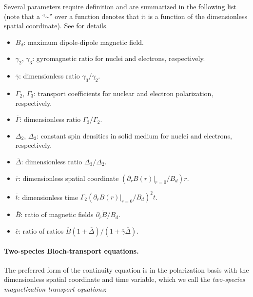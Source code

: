 \documentclass[%
oneside,                 %
final,                   %
10pt]{article}
\begin{document}
\noindent
Several parameters require definition and are summarized in the following list (note that a ``\textasciitilde{}'' over a function denotes that it is a function of the dimensionless spatial coordinate). 
See \cite{Picone2014b} for details.

\begin{itemize}
\item $B_d$: maximum dipole-dipole magnetic field.

\item $\gamma_2$, $\gamma_3$: gyromagnetic ratio for nuclei and electrons, respectively.

\item $\overline{\gamma}$: dimensionless ratio $\gamma_3/\gamma_2$.

\item $\Gamma_2$, $\Gamma_3$: transport coefficients for nuclear and electron polarization, respectively.

\item $\overline{\Gamma}$: dimensionless ratio $\Gamma_3/\Gamma_2$.

\item $\Delta_2$, $\Delta_3$: constant spin densities in solid medium for nuclei and electrons, respectively.

\item $\overline{\Delta}$: dimensionless ratio $\Delta_3/\Delta_2$.

\item $\overline{r}$: dimensionless spatial coordinate $(\partial_r B(r)|_{r=0}/B_d) r$.

\item $\overline{t}$: dimensionless time $\Gamma_2 (\partial_r B(r)|_{r=0}/B_d)^2 t$.

\item $\overline{B}$: ratio of magnetic fields $\partial_{\overline{r}} \tilde{B}/B_d$.

\item $\overline{c}$: ratio of ratios $\overline{B} (1+\overline{\Delta})/(1+\overline{\gamma}\overline{\Delta})$.
\end{itemize}

\noindent
\paragraph{Two-species Bloch-transport equations.}
The preferred form of the continuity equation is in the polarization basis with the dimensionless spatial coordinate and time variable, which we call the \emph{two-species magnetization transport equations}:
\end{document}
